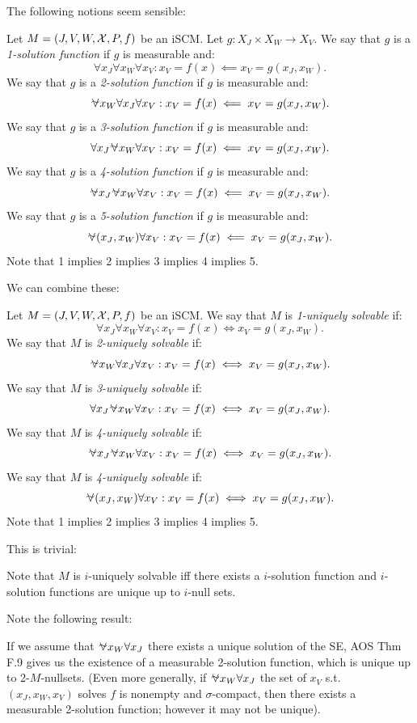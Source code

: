 The following notions seem sensible:
\begin{Def}
  Let $M = \left ( J, V, W, \mathcal{X}, P, f \right )$ be an iSCM.
  Let $g : X_J \times X_W \to X_V$.
  We say that $g$ is a \emph{1-solution function} if $g$ is measurable and:
   $$ \forall x_J \forall x_W \forall x_V: x_V=f(x) \impliedby x_V=g(x_J,x_W).$$
  We say that $g$ is a \emph{2-solution function} if $g$ is measurable and:
   $$ \foralmostall x_W \forall x_J \forall x_V: x_V=f(x) \impliedby x_V=g(x_J,x_W).$$
  We say that $g$ is a \emph{3-solution function} if $g$ is measurable and:
   $$ \forall x_J \foralmostall x_W \forall x_V: x_V=f(x) \impliedby x_V=g(x_J,x_W).$$
  We say that $g$ is a \emph{4-solution function} if $g$ is measurable and:
   $$ \foralmostall x_J \foralmostall x_W \forall x_V: x_V=f(x) \impliedby x_V=g(x_J,x_W).$$
  We say that $g$ is a \emph{5-solution function} if $g$ is measurable and:
   $$ \foralmostall (x_J,x_W) \forall x_V: x_V=f(x) \impliedby x_V=g(x_J,x_W).$$
  Note that 1 implies 2 implies 3 implies 4 implies 5.
\end{Def}
We can combine these:
\begin{Def}
  Let $M = \left ( J, V, W, \mathcal{X}, P, f \right )$ be an iSCM.
  We say that $M$  is \emph{1-uniquely solvable} if:
   $$ \forall x_J \forall x_W \forall x_V: x_V=f(x) \iff x_V=g(x_J,x_W).$$
  We say that $M$ is \emph{2-uniquely solvable} if:
   $$ \foralmostall x_W \forall x_J \forall x_V: x_V=f(x) \iff x_V=g(x_J,x_W).$$
  We say that $M$ is \emph{3-uniquely solvable} if:
   $$ \forall x_J \foralmostall x_W \forall x_V: x_V=f(x) \iff x_V=g(x_J,x_W).$$
  We say that $M$ is \emph{4-uniquely solvable} if:
   $$ \foralmostall x_J \foralmostall x_W \forall x_V: x_V=f(x) \iff x_V=g(x_J,x_W).$$
  We say that $M$ is \emph{4-uniquely solvable} if:
   $$ \foralmostall (x_J,x_W) \forall x_V: x_V=f(x) \iff x_V=g(x_J,x_W).$$
  Note that 1 implies 2 implies 3 implies 4 implies 5.
\end{Def}
This is trivial:
\begin{Lem}
  Note that $M$ is $i$-uniquely solvable iff there exists a $i$-solution function and $i$-solution functions are unique up to $i$-null sets.
\end{Lem}
Note the following result:
\begin{Rem}
  If we assume that $\foralmostall x_W \forall x_J$ there exists a unique solution of the SE, AOS Thm F.9 gives us the existence of a measurable 2-solution function, which is unique up to 2-$M$-nullsets.
  (Even more generally, if $\foralmostall x_W \forall x_J$ the set of $x_V$ s.t.\ $(x_J,x_W,x_V)$ solves $f$ is nonempty and $\sigma$-compact, then there exists a measurable 2-solution function; however
  it may not be unique).
\end{Rem}
